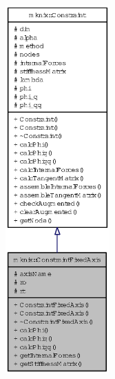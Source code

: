 \begin{figure}[H]
\begin{center}
\leavevmode
\includegraphics[height=400pt]{classmknix_1_1ConstraintFixedAxis__coll__graph}
\end{center}
\end{figure}

